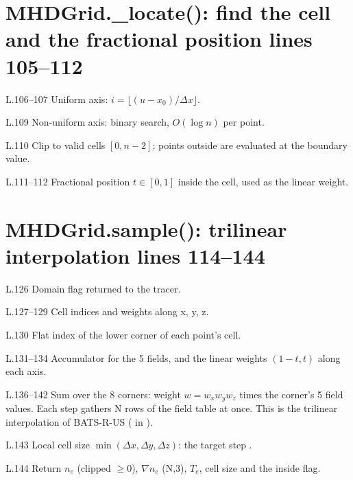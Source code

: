 \section*{\normalsize MHDGrid.\_locate(): find the cell and the fractional position \hfill{\small\mdseries\color{gray}lines 105--112}}

\begin{lines}
\item[L.106–107] Uniform axis: $i=\lfloor(u-x_0)/\Delta x\rfloor$.
\item[L.109] Non-uniform axis: binary search, $O(\log n)$ per point.
\item[L.110] Clip to valid cells $[0,n-2]$; points outside are evaluated at the boundary value.
\item[L.111–112] Fractional position $t\in[0,1]$ inside the cell, used as the linear weight.
\end{lines}
\section*{\normalsize MHDGrid.sample(): trilinear interpolation \hfill{\small\mdseries\color{gray}lines 114--144}}

\begin{lines}
\item[L.126] Domain flag returned to the tracer.
\item[L.127–129] Cell indices and weights along x, y, z.
\item[L.130] Flat index of the lower corner of each point's cell.
\item[L.131–134] Accumulator for the 5 fields, and the linear weights $(1-t, t)$ along each axis.
\item[L.136–142] Sum over the 8 corners: weight $w=w_x w_y w_z$ times the corner's 5 field values. Each step gathers N rows of the field table at once. This is the trilinear interpolation of BATS-R-US ( in ).
\item[L.143] Local cell size $\min(\Delta x,\Delta y,\Delta z)$: the target step .
\item[L.144] Return $n_e$ (clipped $\ge0$), $\nabla n_e$ (N,3), $T_e$, cell size and the inside flag.
\end{lines}
